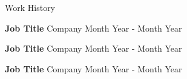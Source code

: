\documentclass{resume} %
\begin{document}

 


\begin{rSection}{Work History}
\vspace{-1.25em}
\item \textbf{Job Title} {Company} \hfill Month Year - Month Year
\item \textbf{Job Title} {Company} \hfill Month Year - Month Year
\item \textbf{Job Title} {Company} \hfill Month Year - Month Year
\end{rSection} 

\end{document}
